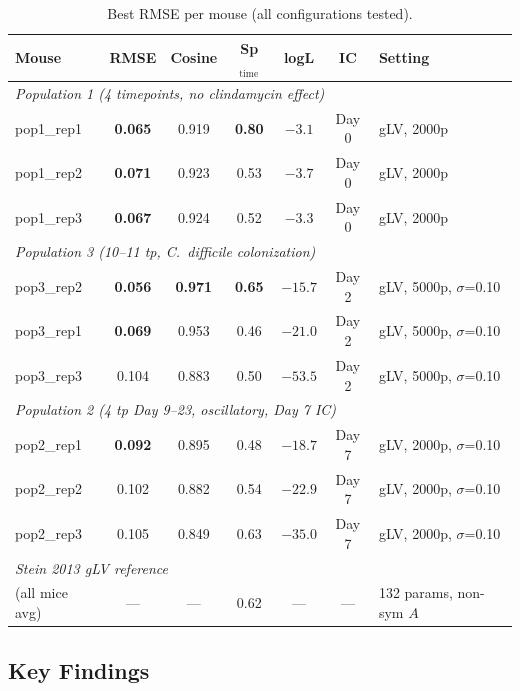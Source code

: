\documentclass[11pt,a4paper]{article}
\begin{document}
\begin{table}[H]\centering
\caption{Best RMSE per mouse (all configurations tested).}
\label{tab:results}
\begin{tabular}{lcccccl}
\toprule
Mouse & RMSE & Cosine & Sp$_\mathrm{time}$ & logL & IC & Setting \\
\midrule
\multicolumn{7}{l}{\textit{Population 1 (4 timepoints, no clindamycin effect)}} \\
pop1\_rep1 & \textbf{0.065} & 0.919 & \textbf{0.80} & $-3.1$ & Day 0 & gLV, 2000p \\
pop1\_rep2 & \textbf{0.071} & 0.923 & 0.53 & $-3.7$ & Day 0 & gLV, 2000p \\
pop1\_rep3 & \textbf{0.067} & 0.924 & 0.52 & $-3.3$ & Day 0 & gLV, 2000p \\
\midrule
\multicolumn{7}{l}{\textit{Population 3 (10--11 tp, C.\ difficile colonization)}} \\
pop3\_rep2 & \textbf{0.056} & \textbf{0.971} & \textbf{0.65} & $-15.7$ & Day 2 & gLV, 5000p, $\sigma$=0.10 \\
pop3\_rep1 & \textbf{0.069} & 0.953 & 0.46 & $-21.0$ & Day 2 & gLV, 5000p, $\sigma$=0.10 \\
pop3\_rep3 & 0.104 & 0.883 & 0.50 & $-53.5$ & Day 2 & gLV, 5000p, $\sigma$=0.10 \\
\midrule
\multicolumn{7}{l}{\textit{Population 2 (4 tp Day 9--23, oscillatory, Day 7 IC)}} \\
pop2\_rep1 & \textbf{0.092} & 0.895 & 0.48 & $-18.7$ & Day 7 & gLV, 2000p, $\sigma$=0.10 \\
pop2\_rep2 & 0.102 & 0.882 & 0.54 & $-22.9$ & Day 7 & gLV, 2000p, $\sigma$=0.10 \\
pop2\_rep3 & 0.105 & 0.849 & 0.63 & $-35.0$ & Day 7 & gLV, 2000p, $\sigma$=0.10 \\
\midrule
\multicolumn{7}{l}{\textit{Stein 2013 gLV reference}} \\
(all mice avg) & --- & --- & 0.62 & --- & --- & 132 params, non-sym $A$ \\
\bottomrule
\end{tabular}
\end{table}

\subsection{Key Findings}
\end{document}
